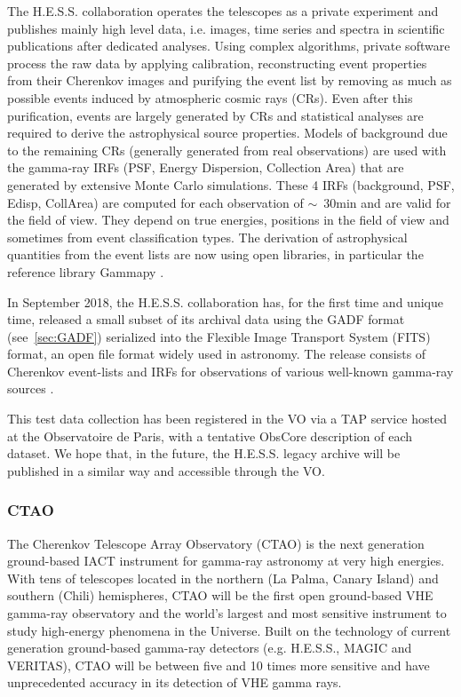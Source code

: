 \documentclass[11pt,a4paper]{ivoa}
\begin{document}
The H.E.S.S. collaboration operates the telescopes as a private experiment and publishes mainly high level data,
i.e. images, time series and spectra in scientific publications after dedicated analyses. Using complex algorithms,
private software process the raw data by applying calibration, reconstructing event properties from their Cherenkov
images and purifying the event list by removing as much as possible events induced by atmospheric cosmic rays (CRs). Even
after this purification, events are largely generated by CRs and statistical analyses are required to derive
the astrophysical source properties. Models of background due to the remaining CRs
(generally generated from real observations) are used with the gamma-ray IRFs (PSF, Energy Dispersion, Collection Area)
that are generated by extensive Monte Carlo simulations. These 4 IRFs (background, PSF, Edisp, CollArea) are computed
for each observation of $\sim$~30min and are valid for the field of view. They depend on true energies, positions in the
field of view and sometimes from event classification types. The derivation of astrophysical quantities from
the event lists are now using open libraries, in particular the reference library Gammapy \citep{gammapy:2023}.

In September 2018, the H.E.S.S. collaboration has, for the first time and unique time, released a small subset of its
archival data using the GADF format (see~\ref{sec:GADF}) serialized into the Flexible Image Transport System (FITS) format,
an open file format widely used in astronomy. The release consists of Cherenkov event-lists and IRFs for observations of
various well-known gamma-ray sources \citep{hess-zenodo.1421098}.

This test data collection has been registered in the VO via a TAP service hosted at the Observatoire de Paris, with a
tentative ObsCore description of each dataset. We hope that, in the future, the H.E.S.S. legacy archive will be published
in a similar way and accessible through the VO.

\subsubsection{CTAO}
\label{sec:ctao}

The Cherenkov Telescope Array Observatory (CTAO) is the next generation ground-based IACT instrument for gamma-ray astronomy
at very high energies. With tens of telescopes located in the northern (La Palma, Canary Island)
and southern (Chili) hemispheres, CTAO will be the  first open ground-based VHE gamma-ray observatory and the world’s
largest and most sensitive instrument to study  high-energy phenomena in the Universe. Built on the technology of current
generation ground-based gamma-ray detectors (e.g. H.E.S.S., MAGIC and VERITAS), CTAO will be between five and 10 times
more sensitive and have unprecedented accuracy  in its detection of VHE gamma rays.
\end{document}
